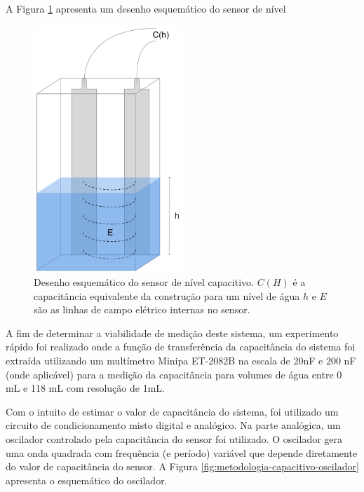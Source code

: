 \documentclass[a4paper]{instrumentacao}
\begin{document}
A Figura \ref{fig:sensor-nivel-capacitivo} apresenta um desenho esquemático do sensor de nível

\begin{figure}[H]
	\centering \includegraphics[width=0.5\textwidth]{SensorNivelCapacitivo.pdf}
	\caption{Desenho esquemático do sensor de nível capacitivo. $C(H)$ é a capacitância equivalente da construção para um nível de água $h$ e $E$ são as linhas de campo elétrico internas no sensor.}
	\label{fig:sensor-nivel-capacitivo}
\end{figure}

A fim de determinar a viabilidade de medição deste sistema, um experimento rápido foi realizado onde a função de transferência da capacitância do sistema foi extraída utilizando um multímetro Minipa ET-2082B \cite{multimetro-minipa} na escala de 20nF e 200 nF (onde aplicável) para a medição da capacitância para volumes de água entre 0 mL e 118 mL com resolução de 1mL.

Com o intuito de estimar o valor de capacitância do sistema, foi utilizado um circuito de condicionamento misto digital e analógico. Na parte analógica, um oscilador controlado pela capacitância do sensor foi utilizado. O oscilador gera uma onda quadrada com frequência (e período) variável que depende diretamente do valor de capacitância do sensor. A Figura \ref{fig:metodologia-capacitivo-oscilador} apresenta o esquemático do oscilador.
\end{document}
